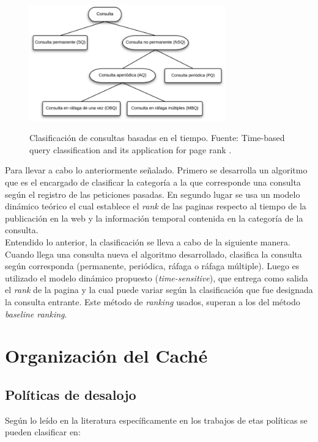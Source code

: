 \documentclass[12pt]{ociamthesis}  %
\begin{document}
\begin{figure}[!htb]
	\centering
	\includegraphics[width=8.5cm]{Imagenes/Clasificacion_consulta_tiempo}\\
	\caption{Clasificación de consultas basadas en el tiempo. Fuente: Time-based query classification and its application for page rank \cite{chen2011time}.}
	\label{clasificacion_consulta_tiempo}
\end{figure}

Para llevar a cabo lo anteriormente señalado. Primero se desarrolla un algoritmo que es el encargado de clasificar la categoría a la que corresponde una consulta según el registro de las peticiones pasadas. En segundo lugar se usa un modelo dinámico teórico el cual establece el \textit{rank} de las paginas respecto al tiempo de la publicación en la web y la información temporal contenida en la categoría de la consulta.\\

Entendido lo anterior, la clasificación se lleva a cabo de la siguiente manera. Cuando llega una consulta nueva el algoritmo desarrollado, clasifica la consulta según corresponda (permanente, periódica, ráfaga o ráfaga múltiple). Luego es utilizado el modelo dinámico propuesto (\textit{time-sensitive}), que entrega como salida el \textit{rank} de la pagina y la cual puede variar según la clasificación que fue designada la consulta entrante. Este método de \textit{ranking} usados, superan a los del método \textit{baseline ranking}.\\


\section{Organización del Caché}

\subsection{Políticas de desalojo}
Según lo leído en la literatura específicamente en los trabajos de \cite{wong2006web}\cite{podlipnig2003survey} etas políticas se pueden clasificar en:
\end{document}
